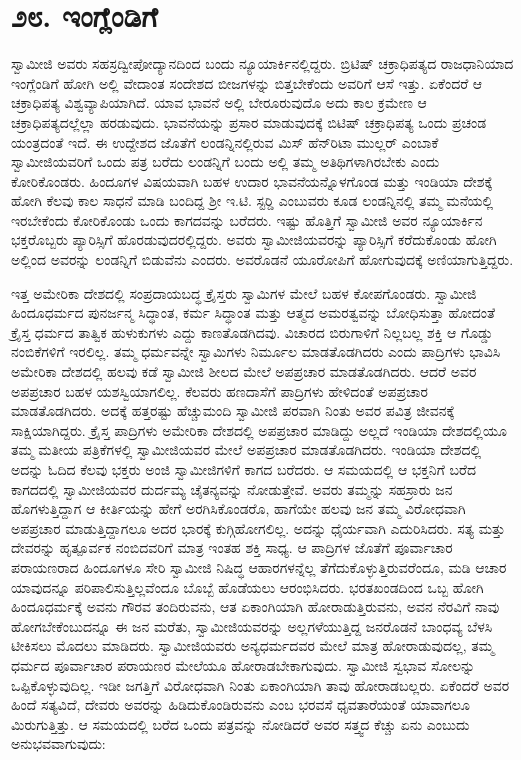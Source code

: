 
\chapter*{೨೮. ಇಂಗ್ಲೆಂಡಿಗೆ}

 ಸ್ವಾಮೀಜಿ ಅವರು ಸಹಸ್ರದ್ವೀಪೋದ್ಯಾನದಿಂದ ಬಂದು ನ್ಯೂಯಾರ್ಕಿನಲ್ಲಿದ್ದರು. ಬ್ರಿಟಿಷ್ ಚಕ್ರಾಧಿಪತ್ಯದ ರಾಜಧಾನಿಯಾದ ಇಂಗ್ಲೆಂಡಿಗೆ ಹೋಗಿ ಅಲ್ಲಿ ವೇದಾಂತ ಸಂದೇಶದ ಬೀಜಗಳನ್ನು ಬಿತ್ತಬೇಕೆಂದು ಅವರಿಗೆ ಆಸೆ ಇತ್ತು. ಏಕೆಂದರೆ ಆ ಚಕ್ರಾಧಿಪತ್ಯ ವಿಶ್ವವ್ಯಾಪಿಯಾಗಿದೆ. ಯಾವ ಭಾವನೆ ಅಲ್ಲಿ ಬೇರೂರುವುದೊ ಅದು ಕಾಲ ಕ್ರಮೇಣ ಆ ಚಕ್ರಾಧಿಪತ್ಯದಲ್ಲೆಲ್ಲಾ ಹರಡುವುದು. ಭಾವನೆಯನ್ನು ಪ್ರಸಾರ ಮಾಡುವುದಕ್ಕೆ ಬಿಟಿಷ್ ಚಕ್ರಾಧಿಪತ್ಯ ಒಂದು ಪ್ರಚಂಡ ಯಂತ್ರದಂತೆ ಇದೆ. ಈ ಉದ್ದೇಶದ ಜೊತೆಗೆ ಲಂಡನ್ನಿನಲ್ಲಿರುವ ಮಿಸ್ ಹೆನ್‍ರಿಟಾ ಮುಲ್ಲರ್ ಎಂಬಾಕೆ ಸ್ವಾಮೀಜಿಯವರಿಗೆ ಒಂದು ಪತ್ರ ಬರೆದು ಲಂಡನ್ನಿಗೆ ಬಂದು ಅಲ್ಲಿ ತಮ್ಮ ಅತಿಥಿಗಳಾಗಿರಬೇಕು ಎಂದು ಕೋರಿಕೊಂಡರು. ಹಿಂದೂಗಳ ವಿಷಯವಾಗಿ ಬಹಳ ಉದಾರ ಭಾವನೆಯನ್ನೊಳಗೊಂಡ ಮತ್ತು ಇಂಡಿಯಾ ದೇಶಕ್ಕೆ ಹೋಗಿ ಕೆಲವು ಕಾಲ ಸಾಧನೆ ಮಾಡಿ ಬಂದಿದ್ದ ಶ‍್ರೀ ಇ.ಟಿ. ಸ್ಟರ‍್ಡಿ ಎಂಬುವರು ಕೂಡ ಲಂಡನ್ನಿನಲ್ಲಿ ತಮ್ಮ ಮನೆಯಲ್ಲಿ ಇರಬೇಕೆಂದು ಕೋರಿಕೊಂಡು ಒಂದು ಕಾಗದವನ್ನು ಬರೆದರು. ಇಷ್ಟು ಹೊತ್ತಿಗೆ ಸ್ವಾಮೀಜಿ ಅವರ ನ್ಯೂಯಾರ್ಕಿನ ಭಕ್ತರೊಬ್ಬರು ಪ್ಯಾರಿಸ್ಸಿಗೆ ಹೊರಡುವುದರಲ್ಲಿದ್ದರು. ಅವರು ಸ್ವಾಮೀಜಿಯವರನ್ನು ಪ್ಯಾರಿಸ್ಸಿಗೆ ಕರೆದುಕೊಂಡು ಹೋಗಿ ಅಲ್ಲಿಂದ ಅವರನ್ನು ಲಂಡನ್ನಿಗೆ ಬಿಡುವೆನು ಎಂದರು. ಅವರೊಡನೆ ಯೂರೋಪಿಗೆ ಹೋಗುವುದಕ್ಕೆ ಅಣಿಯಾಗುತ್ತಿದ್ದರು. 

 ಇತ್ತ ಅಮೇರಿಕಾ ದೇಶದಲ್ಲಿ ಸಂಪ್ರದಾಯಬದ್ಧ ಕ್ರೈಸ್ತರು ಸ್ವಾಮಿಗಳ ಮೇಲೆ ಬಹಳ ಕೋಪಗೊಂಡರು. ಸ್ವಾಮೀಜಿ ಹಿಂದೂಧರ್ಮದ ಪುನರ್ಜನ್ಮ ಸಿದ್ಧಾಂತ, ಕರ್ಮ ಸಿದ್ಧಾಂತ ಮತ್ತು ಆತ್ಮದ ಅಮರತ್ವವನ್ನು ಬೋಧಿಸುತ್ತಾ ಹೋದಂತೆ ಕ್ರೈಸ್ತ ಧರ್ಮದ ತಾತ್ವಿಕ ಹುಳುಕುಗಳು ಎದ್ದು ಕಾಣತೊಡಗಿದವು. ವಿಚಾರದ ಬಿರುಗಾಳಿಗೆ ನಿಲ್ಲಬಲ್ಲ ಶಕ್ತಿ ಆ ಗೊಡ್ಡು ನಂಬಿಕೆಗಳಿಗೆ ಇರಲಿಲ್ಲ. ತಮ್ಮ ಧರ್ಮವನ್ನೇ ಸ್ವಾಮಿಗಳು ನಿರ್ಮೂಲ ಮಾಡತೊಡಗಿದರು ಎಂದು ಪಾದ್ರಿಗಳು ಭಾವಿಸಿ ಅಮೇರಿಕಾ ದೇಶದಲ್ಲಿ ಹಲವು ಕಡೆ ಸ್ವಾಮೀಜಿ ಶೀಲದ ಮೇಲೆ ಅಪಪ್ರಚಾರ ಮಾಡತೊಡಗಿದರು. ಆದರೆ ಅವರ ಅಪಪ್ರಚಾರ ಬಹಳ ಯಶಸ್ವಿಯಾಗಲಿಲ್ಲ. ಕೆಲವರು ಹಣದಾಸೆಗೆ ಪಾದ್ರಿಗಳು ಹೇಳಿದಂತೆ ಅಪಪ್ರಚಾರ ಮಾಡತೊಡಗಿದರು. ಅದಕ್ಕೆ ಹತ್ತರಷ್ಟು ಹೆಚ್ಚುಮಂದಿ ಸ್ವಾಮೀಜಿ ಪರವಾಗಿ ನಿಂತು ಅವರ ಪವಿತ್ರ ಜೀವನಕ್ಕೆ ಸಾಕ್ಷಿಯಾಗಿದ್ದರು. ಕ್ರೈಸ್ತ ಪಾದ್ರಿಗಳು ಅಮೇರಿಕಾ ದೇಶದಲ್ಲಿ ಅಪಪ್ರಚಾರ ಮಾಡಿದ್ದು ಅಲ್ಲದೆ ಇಂಡಿಯಾ ದೇಶದಲ್ಲಿಯೂ ತಮ್ಮ ಮತೀಯ ಪತ್ರಿಕೆಗಳಲ್ಲಿ ಸ್ವಾಮೀಜಿಯವರ ಮೇಲೆ ಅಪಪ್ರಚಾರ ಮಾಡತೊಡಗಿದರು. ಇಂಡಿಯಾ ದೇಶದಲ್ಲಿ ಅದನ್ನು ಓದಿದ ಕೆಲವು ಭಕ್ತರು ಅಂಜಿ ಸ್ವಾಮೀಜಿಗಳಿಗೆ ಕಾಗದ ಬರೆದರು. ಆ ಸಮಯದಲ್ಲಿ ಆ ಭಕ್ತನಿಗೆ ಬರೆದ ಕಾಗದದಲ್ಲಿ ಸ್ವಾಮೀಜಿಯವರ ದುರ್ದಮ್ಯ ಚೈತನ್ಯವನ್ನು ನೋಡುತ್ತೇವೆ. ಅವರು ತಮ್ಮನ್ನು ಸಹಸ್ರಾರು ಜನ ಹೊಗಳುತ್ತಿದ್ದಾಗ ಆ ಕೀರ್ತಿಯನ್ನು ಹೇಗೆ ಅರಗಿಸಿಕೊಂಡರೊ, ಹಾಗೆಯೇ ಹಲವು ಜನ ತಮ್ಮ ವಿರೋಧವಾಗಿ ಅಪಪ್ರಚಾರ ಮಾಡುತ್ತಿದ್ದಾಗಲೂ ಅದರ ಭಾರಕ್ಕೆ ಕುಗ್ಗಿಹೋಗಲಿಲ್ಲ. ಅದನ್ನು ಧೈರ್ಯವಾಗಿ ಎದುರಿಸಿದರು. ಸತ್ಯ ಮತ್ತು ದೇವರನ್ನು ಹೃತ್ಪೂರ್ವಕ ನಂಬಿದವರಿಗೆ ಮಾತ್ರ ಇಂತಹ ಶಕ್ತಿ ಸಾಧ್ಯ. ಆ ಪಾದ್ರಿಗಳ ಜೊತೆಗೆ ಪೂರ್ವಾಚಾರ ಪರಾಯಣರಾದ ಹಿಂದೂಗಳೂ ಸೇರಿ ಸ್ವಾಮೀಜಿ ನಿಷಿದ್ಧ ಆಹಾರಗಳನ್ನೆಲ್ಲ ತೆಗೆದುಕೊಳ್ಳುತ್ತಿರುವರೆಂದೂ, ಮಡಿ ಆಚಾರ ಯಾವುದನ್ನೂ ಪರಿಪಾಲಿಸುತ್ತಿಲ್ಲವೆಂದೂ ಬೊಬ್ಬೆ ಹೊಡೆಯಲು ಆರಂಭಿಸಿದರು. ಭರತಖಂಡದಿಂದ ಒಬ್ಬ ಹೋಗಿ ಹಿಂದೂಧರ್ಮಕ್ಕೆ ಅವನು ಗೌರವ ತಂದಿರುವನು, ಆತ ಏಕಾಂಗಿಯಾಗಿ ಹೋರಾಡುತ್ತಿರುವನು, ಅವನ ನೆರವಿಗೆ ನಾವು ಹೋಗಬೇಕೆಂಬುದನ್ನೂ ಈ ಜನ ಮರೆತು, ಸ್ವಾಮೀಜಿಯವರನ್ನು ಅಲ್ಲಗಳೆಯುತ್ತಿದ್ದ ಜನರೊಡನೆ ಬಾಂಧವ್ಯ ಬೆಳಸಿ ಟೀಕಿಸಲು ಮೊದಲು ಮಾಡಿದರು. ಸ್ವಾಮೀಜಿಯವರು ಅನ್ಯಧರ್ಮದವರ ಮೇಲೆ ಮಾತ್ರ ಹೋರಾಡುವುದಲ್ಲ, ತಮ್ಮ ಧರ್ಮದ ಪೂರ್ವಾಚಾರ ಪರಾಯಣರ ಮೇಲೆಯೂ ಹೋರಾಡಬೇಕಾಗುವುದು. ಸ್ವಾಮೀಜಿ ಸ್ವಭಾವ ಸೋಲನ್ನು ಒಪ್ಪಿಕೊಳ್ಳುವುದಿಲ್ಲ. ಇಡೀ ಜಗತ್ತಿಗೆ ವಿರೋಧವಾಗಿ ನಿಂತು ಏಕಾಂಗಿಯಾಗಿ ತಾವು ಹೋರಾಡಬಲ್ಲರು. ಏಕೆಂದರೆ ಅವರ ಹಿಂದೆ ಸತ್ಯವಿದೆ, ದೇವರು ಅವರನ್ನು ಹಿಡಿದುಕೊಂಡಿರುವನು ಎಂಬ ಭರವಸೆ ಧೃವತಾರೆಯಂತೆ ಯಾವಾಗಲೂ ಮಿರುಗುತ್ತಿತ್ತು. ಆ ಸಮಯದಲ್ಲಿ ಬರೆದ ಒಂದು ಪತ್ರವನ್ನು ನೋಡಿದರೆ ಅವರ ಸತ್ತ್ವದ ಕೆಚ್ಚು ಏನು ಎಂಬುದು ಅನುಭವವಾಗುವುದು: 

